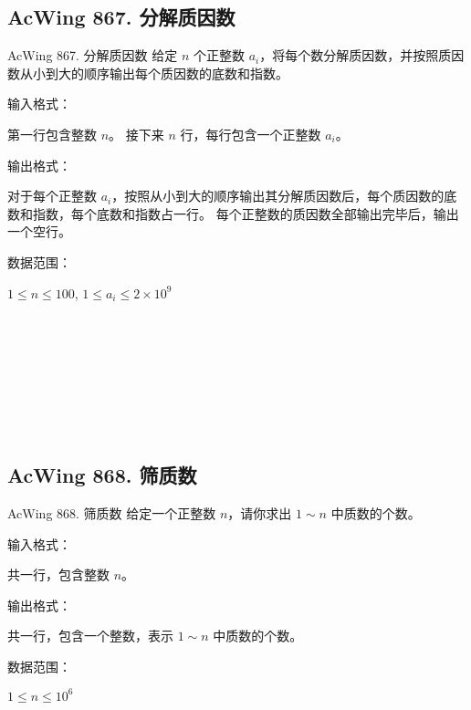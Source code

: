 \subsection{AcWing 867. 分解质因数}
\begin{titledbox}{AcWing 867. 分解质因数}
给定 $n$ 个正整数 $a_i$，将每个数分解质因数，并按照质因数从小到大的顺序输出每个质因数的底数和指数。

输入格式：

第一行包含整数 $n$。 接下来 $n$ 行，每行包含一个正整数 $a_i$。

输出格式：

对于每个正整数 $a_i$，按照从小到大的顺序输出其分解质因数后，每个质因数的底数和指数，每个底数和指数占一行。 每个正整数的质因数全部输出完毕后，输出一个空行。

数据范围：

$1 \le n \le 100$, $1 \le a_i \le 2 \times 10^9$

\begin{inputblock}
 \\
 \\
\end{inputblock}
\begin{outputblock}
 \\
 \\
\\
 \\

\end{outputblock}
\end{titledbox}

\subsection{AcWing 868. 筛质数}
\begin{titledbox}{AcWing 868. 筛质数}
给定一个正整数 $n$，请你求出 $1 \sim n$ 中质数的个数。

输入格式：

共一行，包含整数 $n$。

输出格式：

共一行，包含一个整数，表示 $1 \sim n$ 中质数的个数。

数据范围：

$1 \le n \le 10^6$

\begin{inputblock}
\end{inputblock}
\begin{outputblock}
\end{outputblock}
\end{titledbox}


